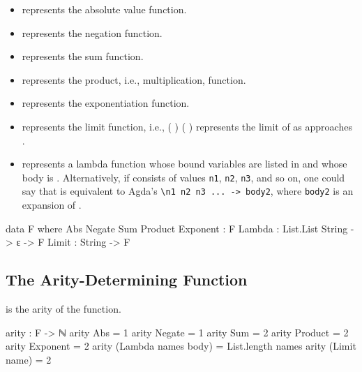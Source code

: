 \documentclass{report}
\begin{document}
\begin{itemize}
  \item {} represents the absolute value function.
  \item {} represents the negation function.
  \item {} represents the sum function.
  \item {} represents the product, i.e., multiplication, function.
  \item {} represents the exponentiation function.
  \item {} represents the limit function, i.e.,  \AgdaSymbol( \AgdaSymbol) \AgdaSymbol(   \AgdaSymbol) represents the limit of  as  approaches .
  \item {}   represents a lambda function whose bound variables are listed in  and whose body is .  Alternatively, if  consists of values \texttt{n1}, \texttt{n2}, \texttt{n3}, and so on, one could say that    is equivalent to Agda's \texttt{\textbackslash n1 n2 n3 ... -> body2}, where \texttt{body2} is an expansion of .
\end{itemize}

\begin{code}
data F where
  Abs
   Negate
   Sum
   Product
   Exponent : F
  Lambda : List.List String -> ε -> F
  Limit : String -> F
\end{code}

\subsection{The Arity-Determining Function}
  is the arity of the  function.

\begin{code}
arity : F -> ℕ
arity Abs = 1
arity Negate = 1
arity Sum = 2
arity Product = 2
arity Exponent = 2
arity (Lambda names body) = List.length names
arity (Limit name) = 2
\end{code}
\end{document}
